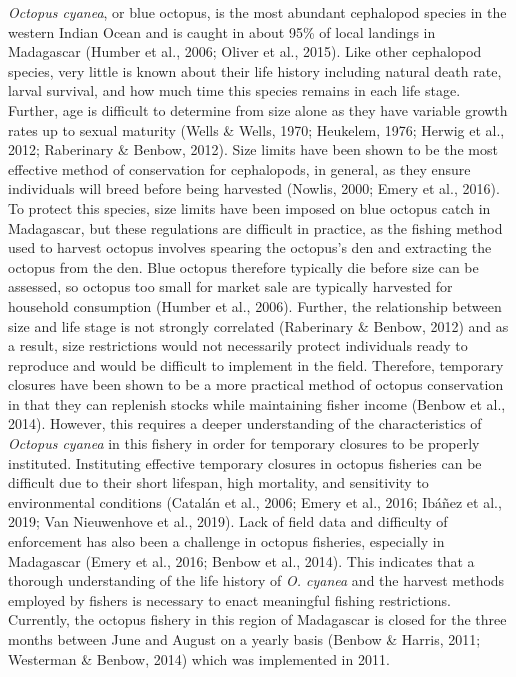 \documentclass[
]{article}
\begin{document}
\emph{Octopus cyanea}, or blue octopus, is the most abundant cephalopod species in the western Indian Ocean and is caught in about 95\% of local landings in Madagascar (Humber et al., 2006; Oliver et al., 2015). Like other cephalopod species, very little is known about their life history including natural death rate, larval survival, and how much time this species remains in each life stage. Further, age is difficult to determine from size alone as they have variable growth rates up to sexual maturity (Wells \& Wells, 1970; Heukelem, 1976; Herwig et al., 2012; Raberinary \& Benbow, 2012). Size limits have been shown to be the most effective method of conservation for cephalopods, in general, as they ensure individuals will breed before being harvested (Nowlis, 2000; Emery et al., 2016). To protect this species, size limits have been imposed on blue octopus catch in Madagascar, but these regulations are difficult in practice, as the fishing method used to harvest octopus involves spearing the octopus's den and extracting the octopus from the den. Blue octopus therefore typically die before size can be assessed, so octopus too small for market sale are typically harvested for household consumption (Humber et al., 2006). Further, the relationship between size and life stage is not strongly correlated (Raberinary \& Benbow, 2012) and as a result, size restrictions would not necessarily protect individuals ready to reproduce and would be difficult to implement in the field. Therefore, temporary closures have been shown to be a more practical method of octopus conservation in that they can replenish stocks while maintaining fisher income (Benbow et al., 2014). However, this requires a deeper understanding of the characteristics of \emph{Octopus cyanea} in this fishery in order for temporary closures to be properly instituted. Instituting effective temporary closures in octopus fisheries can be difficult due to their short lifespan, high mortality, and sensitivity to environmental conditions (Catalán et al., 2006; Emery et al., 2016; Ibáñez et al., 2019; Van Nieuwenhove et al., 2019). Lack of field data and difficulty of enforcement has also been a challenge in octopus fisheries, especially in Madagascar (Emery et al., 2016; Benbow et al., 2014). This indicates that a thorough understanding of the life history of \emph{O. cyanea} and the harvest methods employed by fishers is necessary to enact meaningful fishing restrictions. Currently, the octopus fishery in this region of Madagascar is closed for the three months between June and August on a yearly basis (Benbow \& Harris, 2011; Westerman \& Benbow, 2014) which was implemented in 2011.
\end{document}

